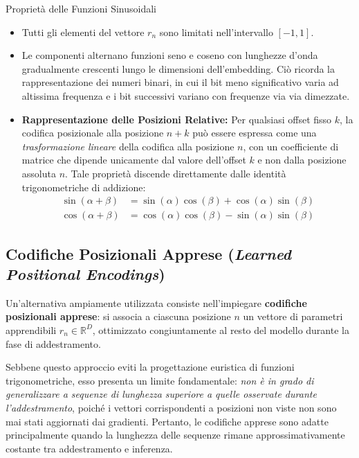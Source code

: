 \begin{observation}{Proprietà delle Funzioni Sinusoidali}
\begin{itemize}
    \item Tutti gli elementi del vettore \(r_n\) sono limitati nell'intervallo \([-1, 1]\).
    \item Le componenti alternano funzioni seno e coseno con lunghezze d'onda gradualmente crescenti lungo le dimensioni dell'embedding. Ciò ricorda la rappresentazione dei numeri binari, in cui il bit meno significativo varia ad altissima frequenza e i bit successivi variano con frequenze via via dimezzate.
    \item \textbf{Rappresentazione delle Posizioni Relative:} Per qualsiasi offset fisso \(k\), la codifica posizionale alla posizione \(n+k\) può essere espressa come una \emph{trasformazione lineare} della codifica alla posizione \(n\), con un coefficiente di matrice che dipende unicamente dal valore dell'offset \(k\) e non dalla posizione assoluta \(n\). Tale proprietà discende direttamente dalle identità trigonometriche di addizione:
    \begin{align*}
    \sin(\alpha + \beta) &= \sin(\alpha)\cos(\beta) + \cos(\alpha)\sin(\beta) \\
    \cos(\alpha + \beta) &= \cos(\alpha)\cos(\beta) - \sin(\alpha)\sin(\beta)
    \end{align*}
\end{itemize}
\end{observation}

\subsection{Codifiche Posizionali Apprese (\textit{Learned Positional Encodings})}
Un'alternativa ampiamente utilizzata consiste nell'impiegare \textbf{codifiche posizionali apprese}: si associa a ciascuna posizione \(n\) un vettore di parametri apprendibili \(r_n \in \mathbb{R}^D\), ottimizzato congiuntamente al resto del modello durante la fase di addestramento.

Sebbene questo approccio eviti la progettazione euristica di funzioni trigonometriche, esso presenta un limite fondamentale: \emph{non è in grado di generalizzare a sequenze di lunghezza superiore a quelle osservate durante l'addestramento}, poiché i vettori corrispondenti a posizioni non viste non sono mai stati aggiornati dai gradienti. Pertanto, le codifiche apprese sono adatte principalmente quando la lunghezza delle sequenze rimane approssimativamente costante tra addestramento e inferenza.

